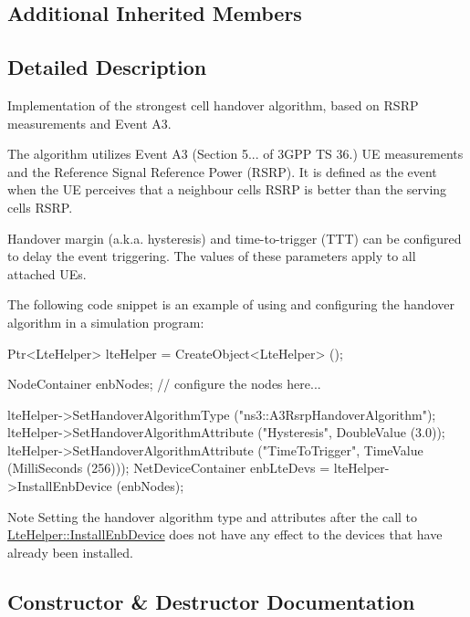 \subsection*{Additional Inherited Members}


\subsection{Detailed Description}
Implementation of the strongest cell handover algorithm, based on R\+S\+RP measurements and Event A3. 

The algorithm utilizes Event A3 (Section 5... of 3\+G\+PP TS 36.) UE measurements and the Reference Signal Reference Power (R\+S\+RP). It is defined as the event when the UE perceives that a neighbour cell\textquotesingle{}s R\+S\+RP is better than the serving cell\textquotesingle{}s R\+S\+RP.

Handover margin (a.\+k.\+a. hysteresis) and time-\/to-\/trigger (T\+TT) can be configured to delay the event triggering. The values of these parameters apply to all attached U\+Es.

The following code snippet is an example of using and configuring the handover algorithm in a simulation program\+: \begin{DoxyVerb}Ptr<LteHelper> lteHelper = CreateObject<LteHelper> ();

NodeContainer enbNodes;
// configure the nodes here...

lteHelper->SetHandoverAlgorithmType ("ns3::A3RsrpHandoverAlgorithm");
lteHelper->SetHandoverAlgorithmAttribute ("Hysteresis",
                                          DoubleValue (3.0));
lteHelper->SetHandoverAlgorithmAttribute ("TimeToTrigger",
                                          TimeValue (MilliSeconds (256)));
NetDeviceContainer enbLteDevs = lteHelper->InstallEnbDevice (enbNodes);
\end{DoxyVerb}


\begin{DoxyNote}{Note}
Setting the handover algorithm type and attributes after the call to \hyperlink{classns3_1_1LteHelper_a5e009ad35ef85f46b5a6099263f15a03}{Lte\+Helper\+::\+Install\+Enb\+Device} does not have any effect to the devices that have already been installed. 
\end{DoxyNote}


\subsection{Constructor \& Destructor Documentation}
